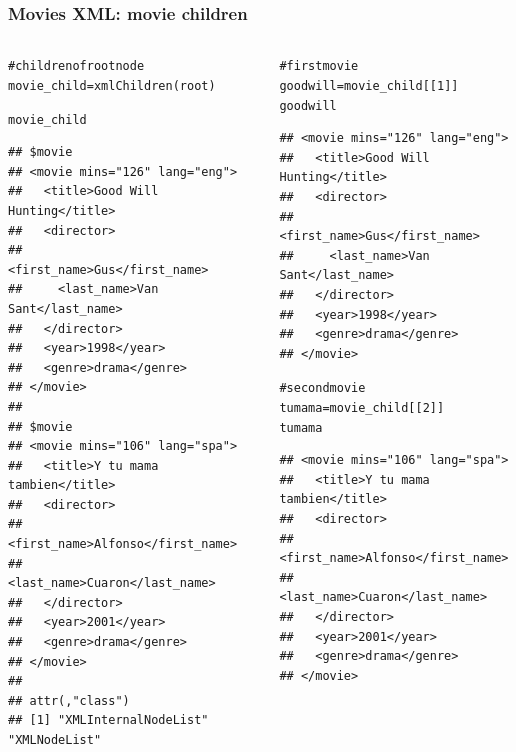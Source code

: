 \documentclass{beamer}\usepackage[]{graphicx}\usepackage[]{color}
\makeatletter
\newcommand{\hlnum}[1]{\textcolor[rgb]{0.063,0.58,0.627}{#1}}%
\newcommand{\hlcom}[1]{\textcolor[rgb]{0.588,0.588,0.588}{#1}}%
\newcommand{\hlstd}[1]{\textcolor[rgb]{0.196,0.196,0.196}{#1}}%
\newcommand{\hlkwb}[1]{\textcolor[rgb]{0.627,0,0.314}{#1}}%
\newcommand{\hlkwd}[1]{\textcolor[rgb]{0.78,0.227,0.412}{#1}}%
\newenvironment{kframe}{%
 \def\at@end@of@kframe{}%
 \ifinner\ifhmode%
  \def\at@end@of@kframe{\end{minipage}}%
  \begin{minipage}{\columnwidth}%
 \fi\fi%
 \def\FrameCommand##1{\hskip\@totalleftmargin \hskip-\fboxsep
 \colorbox{shadecolor}{##1}\hskip-\fboxsep
     \hskip-\linewidth \hskip-\@totalleftmargin \hskip\columnwidth}%
 \MakeFramed {\advance\hsize-\width
   \@totalleftmargin\z@ \linewidth\hsize
   \@setminipage}}%
 {\par\unskip\endMakeFramed%
 \at@end@of@kframe}
\newenvironment{knitrout}{}{} %
\makeatother
\begin{document}

\begin{frame}[fragile]
\frametitle{Movies XML: movie children}

\begin{columns}[t]
\begin{column}{0.5\textwidth}
\begin{knitrout}\tiny
{}\color{fgcolor}\begin{kframe}
\begin{alltt}
\hlcom{# children of root node}
\hlstd{movie_child} \hlkwb{=} \hlkwd{xmlChildren}\hlstd{(root)}

\hlstd{movie_child}
\end{alltt}
\begin{verbatim}
## $movie
## <movie mins="126" lang="eng">
##   <title>Good Will Hunting</title>
##   <director>
##     <first_name>Gus</first_name>
##     <last_name>Van Sant</last_name>
##   </director>
##   <year>1998</year>
##   <genre>drama</genre>
## </movie> 
## 
## $movie
## <movie mins="106" lang="spa">
##   <title>Y tu mama tambien</title>
##   <director>
##     <first_name>Alfonso</first_name>
##     <last_name>Cuaron</last_name>
##   </director>
##   <year>2001</year>
##   <genre>drama</genre>
## </movie> 
## 
## attr(,"class")
## [1] "XMLInternalNodeList" "XMLNodeList"
\end{verbatim}
\end{kframe}
\end{knitrout}
\end{column}

\begin{column}{0.5\textwidth}
\begin{knitrout}\tiny
{}\color{fgcolor}\begin{kframe}
\begin{alltt}
\hlcom{# first movie}
\hlstd{goodwill} \hlkwb{=} \hlstd{movie_child[[}\hlnum{1}\hlstd{]]}
\hlstd{goodwill}
\end{alltt}
\begin{verbatim}
## <movie mins="126" lang="eng">
##   <title>Good Will Hunting</title>
##   <director>
##     <first_name>Gus</first_name>
##     <last_name>Van Sant</last_name>
##   </director>
##   <year>1998</year>
##   <genre>drama</genre>
## </movie>
\end{verbatim}
\begin{alltt}
\hlcom{# second movie}
\hlstd{tumama} \hlkwb{=} \hlstd{movie_child[[}\hlnum{2}\hlstd{]]}
\hlstd{tumama}
\end{alltt}
\begin{verbatim}
## <movie mins="106" lang="spa">
##   <title>Y tu mama tambien</title>
##   <director>
##     <first_name>Alfonso</first_name>
##     <last_name>Cuaron</last_name>
##   </director>
##   <year>2001</year>
##   <genre>drama</genre>
## </movie>
\end{verbatim}
\end{kframe}
\end{knitrout}
\end{column}
\end{columns}


\end{frame}
\end{document}

